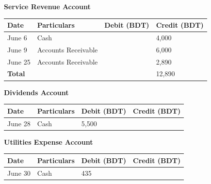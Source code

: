 \documentclass[12pt,a4paper]{book}
\begin{document}
\vspace{0.5cm}

\begin{center}
\textbf{Service Revenue Account}\\
\begin{tabular}{|p{2cm}|p{8cm}|p{2.5cm}|p{2.7cm}|}
\hline
\textbf{Date} & \textbf{Particulars} & \textbf{Debit (BDT)} & \textbf{Credit (BDT)} \\
\hline
June 6 & Cash & & 4,000 \\
June 9 & Accounts Receivable & & 6,000 \\
June 25 & Accounts Receivable & & 2,890 \\
\hline
\textbf{Total} & & & 12,890 \\
\hline
\end{tabular}
\end{center}

\vspace{0.5cm}

\begin{center}
\textbf{Dividends Account}\\
\begin{tabular}{|p{2cm}|p{8cm}|p{2.5cm}|p{2.7cm}|}
\hline
\textbf{Date} & \textbf{Particulars} & \textbf{Debit (BDT)} & \textbf{Credit (BDT)} \\
\hline
June 28 & Cash & 5,500 & \\
\hline
\end{tabular}
\end{center}

\vspace{0.5cm}

\begin{center}
\textbf{Utilities Expense Account}\\
\begin{tabular}{|p{2cm}|p{8cm}|p{2.5cm}|p{2.7cm}|}
\hline
\textbf{Date} & \textbf{Particulars} & \textbf{Debit (BDT)} & \textbf{Credit (BDT)} \\
\hline
June 30 & Cash & 435 & \\
\hline
\end{tabular}
\end{center}

\vspace{0.5cm}
\clearpage




\vspace{1cm}
\clearpage

\end{document}
